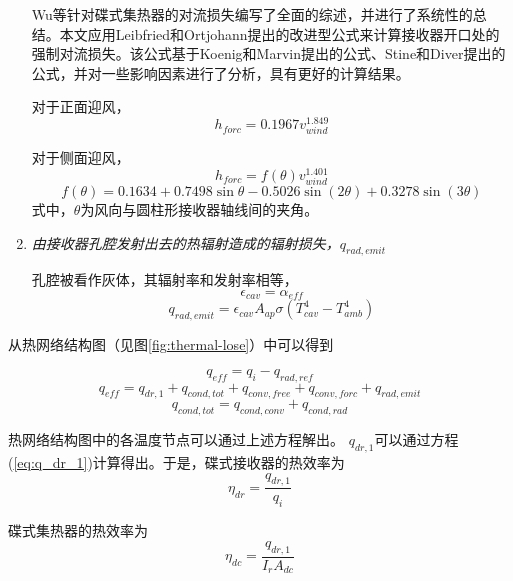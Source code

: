 \begin{enumerate}[label=(\arabic*)]
    Wu等\cite{Wu2010}针对碟式集热器的对流损失编写了全面的综述，并进行了系统性的总结。本文应用Leibfried和Ortjohann\cite{Leibfried1995}提出的改进型公式来计算接收器开口处的强制对流损失。该公式基于Koenig和Marvin\cite{Koenig1981}提出的公式、Stine和Diver\cite{Stine1994}提出的公式，并对一些影响因素进行了分析，具有更好的计算结果。

对于正面迎风，
\begin{equation}
	h_{forc}=0.1967v_{wind}^{1.849}
\end{equation}

对于侧面迎风，
\begin{equation}
	h_{forc}=f(\theta)v_{wind}^{1.401}
\end{equation}
\begin{equation}
	f(\theta)=0.1634 + 0.7498\sin\theta - 0.5026\sin(2\theta) + 0.3278\sin(3\theta)
\end{equation}
式中，$\theta$为风向与圆柱形接收器轴线间的夹角。

  \item \emph{由接收器孔腔发射出去的热辐射造成的辐射损失，$q_{rad,emit}$}
  
  孔腔被看作灰体，其辐射率和发射率相等，
\begin{equation}
    \epsilon_{cav}=\alpha_{eff}
\end{equation}
\begin{equation}
    q_{rad,emit}=\epsilon_{cav}A_{ap}\sigma(T_{cav}^{4}-T_{amb}^{4})
\end{equation}
\end{enumerate}

从热网络结构图（见图\ref{fig:thermal-lose}）中可以得到

\begin{equation}
  q_{eff} = q_i - q_{rad,ref}
\end{equation}
\begin{equation}
  q_{eff} = q_{dr,1} + q_{cond,tot} + q_{conv,free} + q_{conv,forc}+q_{rad,emit}
\end{equation}
\begin{equation}
  q_{cond,tot} = q_{cond,conv}+q_{cond,rad}
\end{equation}


热网络结构图中的各温度节点可以通过上述方程解出。
$q_{dr,1}$可以通过方程(\ref{eq:q_dr_1})计算得出。于是，碟式接收器的热效率为
\begin{equation}
  \eta_{dr} = \frac{q_{dr,1}}{q_i}
\end{equation}

碟式集热器的热效率为
\begin{equation}
  \eta_{dc} = \frac{q_{dr,1}}{I_rA_{dc}}
\end{equation}

